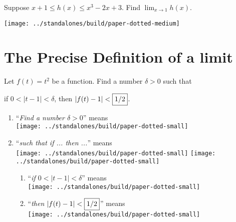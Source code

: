 \documentclass[../main.tex]{subfiles}
\begin{document}
\begin{example}
  Suppose \(x+1 \le h(x) \le x^{3} - 2x + 3\). Find \(\lim_{x \to 1} h(x)\).
  
\texttt{[image: ../standalones/build/paper-dotted-medium]}
\end{example}

\section{The Precise Definition of a limit}

\begin{example} \label{example:delta}
  Let \(f(t) = t^{2}\) be a function. Find a number \(\delta > 0\) such that
  \begin{center}
    if \(0 < | t - 1 | < \delta\), then \(|f(t) - 1| < \fbox{{1/2}}\).
  \end{center}

  \begin{enumerate}
    \item ``\textit{Find a number \(\delta > 0\)}'' means \\
          \texttt{[image: ../standalones/build/paper-dotted-small]}
    \item ``\textit{such that if ... then ...}'' means \\
          \texttt{[image: ../standalones/build/paper-dotted-small]}
          \texttt{[image: ../standalones/build/paper-dotted-small]}
          \begin{enumerate}
            \item ``\textit{if \(0 < |t - 1| < \delta\)}'' means \\
                  \texttt{[image: ../standalones/build/paper-dotted-small]}

            \item ``\textit{then \(|f(t) - 1| < \fbox{{1/2}}\)}'' means \\
                  \texttt{[image: ../standalones/build/paper-dotted-small]}
          \end{enumerate}
  \end{enumerate}


\end{example}
\end{document}
